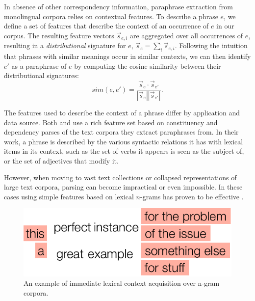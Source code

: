 \documentclass[11pt]{article}
\begin{document}
In absence of other correspondency information, paraphrase extraction
from monolingual corpora relies on contextual features. To describe a
phrase $e$, we define a set of features that describe the context of
an occurrence of $e$ in our corpus. The resulting feature vectors
$\vec{s}_{e,i}$ are aggregated over all occurrences of $e$, resulting
in a \emph{distributional} signature for $e$, $\vec{s}_e = \sum_i
\vec{s}_{e,i}$.  Following the intuition that phrases with similar
meanings occur in similar contexts, we can then identify $e'$ as a
paraphrase of $e$ by computing the cosine similarity between their
distributional signatures:
\begin{equation*}
  \mathit{sim}(e, e') = \frac{\vec{s}_e \cdot \vec{s}_{e'}}{|\vec{s}_e||\vec{s}_{e'}|}.
\end{equation*}

The features used to describe the context of a phrase differ by
application and data source. Both  and
 use a rich feature set based on constituency
and dependency parses of the text corpora they extract paraphrases
from. In their work, a phrase is described by the various syntactic
relations it has with lexical items in its context, such as the set of
verbs it appears is seen as the subject of, or the set of adjectives
that modify it. 

However, when moving to vast text collections or collapsed
representations of large text corpora, parsing can become impractical
or even impossible. In these cases using simple features based on
lexical $n$-grams has proven to be effective
\cite{LapataKellerSaLP05,Bhagat2008,LinEtAlLREC10,VanDurmeLallACL10}.

\begin{figure}[!t]
\begin{center}
\includegraphics[width=0.99\linewidth]{figures/ngram_context.pdf}
\end{center}
\caption{An example of immediate lexical context acquisition over
  n-gram corpora.}\label{fig-ngram-context}
\end{figure}
\end{document}
